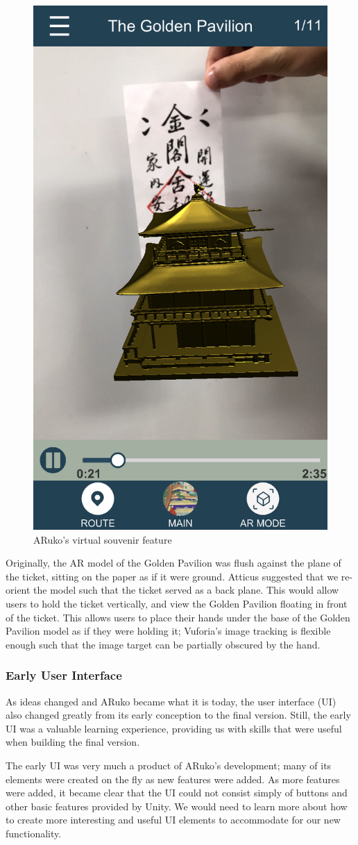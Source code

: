 \documentclass[a4paper, 10pt, american, titlepage]{article}
\begin{document}
\begin{figure}[h]
	\centering
	\includegraphics[width=.5\textwidth]{souvenir.png}
	\caption{ARuko's virtual souvenir feature}
	\label{fig:souvenir}
\end{figure}

Originally, the AR model of the Golden Pavilion was flush against the plane of
the ticket, sitting on the paper as if it were ground. Atticus suggested that we
re-orient the model such that the ticket served as a back plane. This would
allow users to hold the ticket vertically, and view the Golden Pavilion floating
in front of the ticket. This allows users to place their hands under the base of
the Golden Pavilion model as if they were holding it; Vuforia's image tracking
is flexible enough such that the image target can be partially obscured by the
hand.

\subsubsection{Early User Interface}
\label{sec:earlyUserInterface}

As ideas changed and ARuko became what it is today, the user interface (UI) also
changed greatly from its early conception to the final version. Still, the early
UI was a valuable learning experience, providing us with skills that were useful
when building the final version.

The early UI was very much a product of ARuko's development; many of its
elements were created on the fly as new features were added. As more features
were added, it became clear that the UI could not consist simply of buttons and
other basic features provided by Unity. We would need to learn more about how to
create more interesting and useful UI elements to accommodate for our new
functionality.
\end{document}
